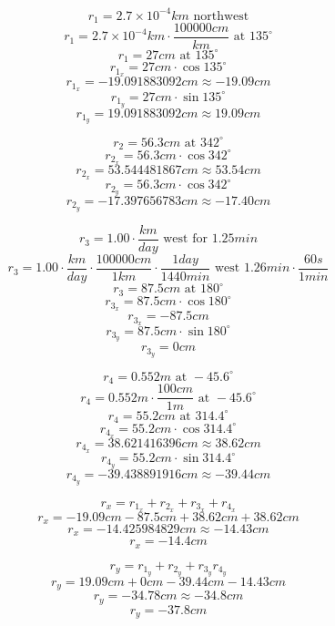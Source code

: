 \documentclass[11pt, letterpaper, includehead]{article}
\begin{document}
\begin{multicols}{2}
  $$r_1 = 2.7\times10^{-4}km \text{ northwest}$$
  $$r_1 = 2.7\times10^{-4}km \cdot\frac{100000cm}{km}\text{ at }135^{\circ}$$
  $$r_1 = 27cm \text{ at }135^{\circ}$$
  $$r_{1_x} = 27cm\cdot\cos135^{\circ}$$
  $$r_{1_x} = -19.091883092cm \approx -19.09cm$$
  $$r_{1_y} = 27cm\cdot\sin135^{\circ}$$
  $$r_{1_y} = 19.091883092cm \approx 19.09cm$$

  \columnbreak
  $$r_2 = 56.3cm \text{ at } 342^{\circ}$$
  $$r_{2_x} = 56.3cm\cdot\cos342^{\circ}$$
  $$r_{2_x} = 53.544481867cm \approx 53.54cm$$
  $$r_{2_y} = 56.3cm\cdot\cos342^{\circ}$$
  $$r_{2_y} = -17.397656783cm \approx -17.40cm$$
\end{multicols}

\hspace{0.5cm}

\begin{multicols}{2}
  $$r_3 = 1.00\cdot\frac{km}{day} \text{ west for }1.25min$$
  $$r_3 = 1.00\cdot\frac{km}{day}\cdot\frac{100000cm}{1km}\cdot\frac{1day}{1440min}\text{ west }1.26min\cdot\frac{60s}{1min}$$
  $$r_3 = 87.5cm\text{ at }180^{\circ}$$
  $$r_{3_x} = 87.5cm\cdot\cos180^{\circ}$$
  $$r_{3_x} = -87.5cm$$
  $$r_{3_y} = 87.5cm\cdot\sin180^{\circ}$$
  $$r_{3_y} = 0cm$$

  \columnbreak
  $$r_4 = 0.552m \text{ at } -45.6^{\circ}$$
  $$r_4 = 0.552m\cdot\frac{100cm}{1m} \text{ at } -45.6^{\circ}$$
  $$r_4 = 55.2cm \text{ at } 314.4^{\circ}$$
  $$r_{4_x} = 55.2cm\cdot\cos314.4^{\circ}$$
  $$r_{4_x} = 38.621416396cm \approx 38.62cm$$
  $$r_{4_y} = 55.2cm\cdot\sin314.4^{\circ}$$
  $$r_{4_y} = -39.438891916cm \approx -39.44cm$$
\end{multicols}

\hspace{0.5cm}

\begin{multicols}{2}
  $$r_x = r_{1_x} + r_{2_x} + r_{3_x} + r_{4_x}$$
  $$r_x = -19.09cm -87.5cm + 38.62cm + 38.62cm$$
  $$r_x = -14.425984829cm \approx -14.43cm$$
  $$\boxed{r_x = -14.4cm}$$
  
  \columnbreak
  $$r_y = r_{1_y} + r_{2_y} + r_{3_y} r_{4_y}$$
  $$r_y = 19.09cm + 0cm -39.44cm -14.43cm$$
  $$r_y= -34.78cm \approx -34.8cm$$
  $$\boxed{r_y = -37.8cm}$$
\end{multicols}
\end{document}
